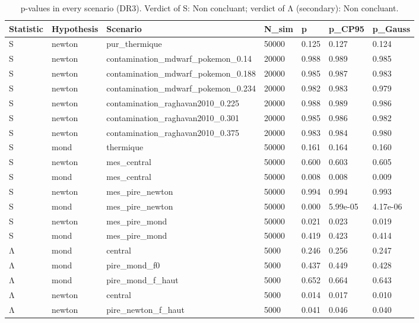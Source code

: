 \begin{table}
\caption{p-values in every scenario (DR3). Verdict of S: Non concluant; verdict of Λ (secondary): Non concluant.}
\begin{tabular}{lllllll}
\toprule
Statistic & Hypothesis & Scenario & N\_sim & p & p\_CP95 & p\_Gauss \\
\midrule
S & newton & pur\_thermique & 50000 & 0.125 & 0.127 & 0.124 \\
S & newton & contamination\_mdwarf\_pokemon\_0.14 & 20000 & 0.988 & 0.989 & 0.985 \\
S & newton & contamination\_mdwarf\_pokemon\_0.188 & 20000 & 0.985 & 0.987 & 0.983 \\
S & newton & contamination\_mdwarf\_pokemon\_0.234 & 20000 & 0.982 & 0.983 & 0.979 \\
S & newton & contamination\_raghavan2010\_0.225 & 20000 & 0.988 & 0.989 & 0.986 \\
S & newton & contamination\_raghavan2010\_0.301 & 20000 & 0.985 & 0.986 & 0.982 \\
S & newton & contamination\_raghavan2010\_0.375 & 20000 & 0.983 & 0.984 & 0.980 \\
S & mond & thermique & 50000 & 0.161 & 0.164 & 0.160 \\
S & newton & mes\_central & 50000 & 0.600 & 0.603 & 0.605 \\
S & mond & mes\_central & 50000 & 0.008 & 0.008 & 0.009 \\
S & newton & mes\_pire\_newton & 50000 & 0.994 & 0.994 & 0.993 \\
S & mond & mes\_pire\_newton & 50000 & 0.000 & 5.99e-05 & 4.17e-06 \\
S & newton & mes\_pire\_mond & 50000 & 0.021 & 0.023 & 0.019 \\
S & mond & mes\_pire\_mond & 50000 & 0.419 & 0.423 & 0.414 \\
Λ & mond & central & 5000 & 0.246 & 0.256 & 0.247 \\
Λ & mond & pire\_mond\_f0 & 5000 & 0.437 & 0.449 & 0.428 \\
Λ & mond & pire\_mond\_f\_haut & 5000 & 0.652 & 0.664 & 0.643 \\
Λ & newton & central & 5000 & 0.014 & 0.017 & 0.010 \\
Λ & newton & pire\_newton\_f\_haut & 5000 & 0.041 & 0.046 & 0.040 \\
\bottomrule
\end{tabular}
\end{table}
